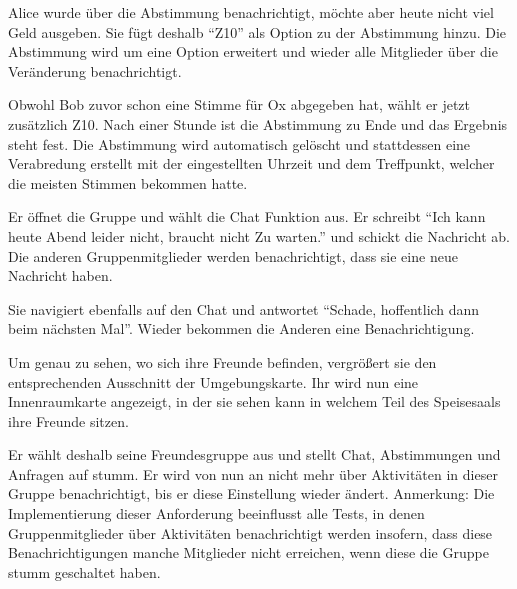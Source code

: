 \documentclass[parskip=full,11pt]{scrartcl}
\begin{document}
{Alice wurde über die Abstimmung benachrichtigt, möchte aber heute nicht viel Geld ausgeben.
Sie fügt deshalb \enquote{Z10} als Option zu der Abstimmung hinzu.}
{Die Abstimmung wird um eine Option erweitert und
wieder alle Mitglieder über die Veränderung benachrichtigt.}

{Obwohl Bob zuvor schon eine Stimme für Ox abgegeben hat, wählt er jetzt zusätzlich Z10.}
{Nach einer Stunde ist die Abstimmung zu Ende und das Ergebnis steht fest.
Die Abstimmung wird automatisch gelöscht und stattdessen eine Verabredung erstellt mit der
eingestellten Uhrzeit und dem Treffpunkt, welcher die meisten Stimmen bekommen hatte.}


{Er öffnet die Gruppe und wählt die Chat Funktion aus. Er schreibt \enquote{Ich kann heute Abend leider nicht, braucht nicht Zu warten.} und schickt die Nachricht ab.}
{Die anderen Gruppenmitglieder werden benachrichtigt, dass sie eine neue Nachricht haben.}

{Sie navigiert ebenfalls auf den Chat und antwortet \enquote{Schade, hoffentlich dann beim
nächsten Mal}.}
{Wieder bekommen die Anderen eine Benachrichtigung.}


{Um genau zu sehen, wo sich ihre Freunde befinden, vergrößert sie den entsprechenden
Ausschnitt der Umgebungskarte.}
{Ihr wird nun eine Innenraumkarte angezeigt, in der sie sehen kann in welchem Teil
des Speisesaals ihre Freunde sitzen.}


{Er wählt deshalb seine Freundesgruppe aus und stellt Chat, Abstimmungen und Anfragen auf stumm.}
{Er wird von nun an nicht mehr über Aktivitäten in dieser Gruppe benachrichtigt,
bis er diese Einstellung wieder ändert.}
Anmerkung: Die Implementierung dieser Anforderung beeinflusst alle Tests, in denen
Gruppenmitglieder über Aktivitäten benachrichtigt werden insofern, dass diese Benachrichtigungen
manche Mitglieder nicht erreichen, wenn diese die Gruppe stumm geschaltet haben.
\end{document}
